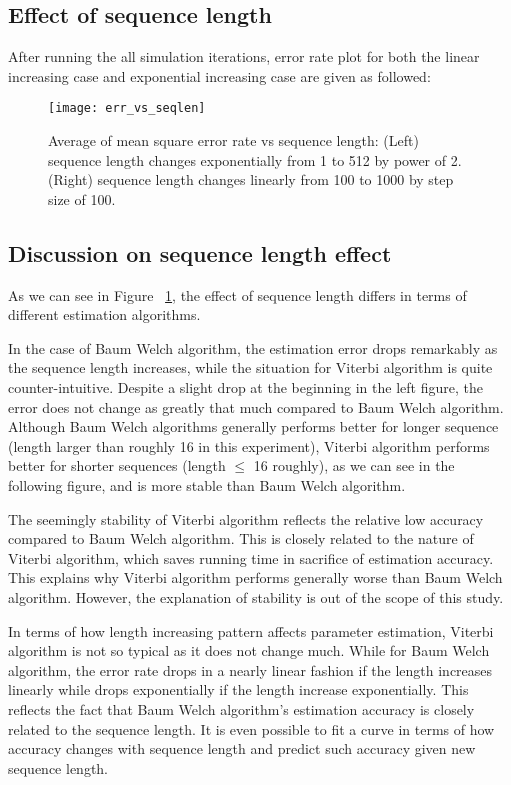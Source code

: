 \documentclass[paper=a4, fontsize=11pt]{scrartcl} %
\numberwithin{equation}{section} %
\numberwithin{figure}{section} %
\numberwithin{table}{section} %
\begin{document}
\subsection {Effect of sequence length}

After running the all simulation iterations, error rate plot for both the linear increasing case and exponential increasing case are given as followed:

\begin{figure}[H]
  \centering
  \texttt{[image: err\_vs\_seqlen]}
  \caption {Average of mean square error rate vs sequence length: (Left) sequence length changes exponentially from 1 to 512 by power of 2. (Right) sequence length changes linearly from 100 to 1000 by step size of 100.}
  \label{fig:6.err_vs_seqlen}
\end{figure}

\subsection {Discussion on sequence length effect}

As we can see in Figure ~\ref{fig:6.err_vs_seqlen}, the effect of sequence length differs in terms of different estimation algorithms. 

In the case of Baum Welch algorithm, the estimation error drops remarkably as the sequence length increases, while the situation for Viterbi algorithm is quite counter-intuitive. Despite a slight drop at the beginning in the left figure, the error does not change as greatly that much compared to Baum Welch algorithm. Although Baum Welch algorithms generally performs better for longer sequence (length larger than roughly 16 in this experiment), Viterbi algorithm performs better for shorter sequences (length $\le$ 16 roughly), as we can see in the following figure, and is more stable than Baum Welch algorithm.

The seemingly stability of Viterbi algorithm reflects the relative low accuracy compared to Baum Welch algorithm. This is closely related to the nature of Viterbi algorithm, which saves running time in sacrifice of estimation accuracy. This explains why Viterbi algorithm performs generally worse than Baum Welch algorithm. However, the explanation of stability is out of the scope of this study.

In terms of how length increasing pattern affects parameter estimation, Viterbi algorithm is not so typical as it does not change much. While for Baum Welch algorithm, the error rate drops in a nearly linear fashion if the length increases linearly while drops exponentially if the length increase exponentially. This reflects the fact that Baum Welch algorithm's estimation accuracy is closely related to the sequence length. It is even possible to fit a curve in terms of how accuracy changes with sequence length and predict such accuracy given new sequence length.
\end{document}
